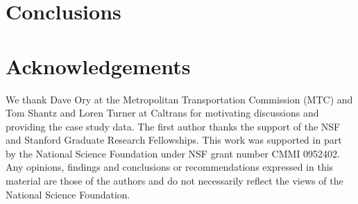 \documentclass[3p,times]{elsarticle}
\begin{document}
\section{Conclusions}
\label{sec:accConc}


\section{Acknowledgements}
\label{sec:accAckn}
We thank Dave Ory at the Metropolitan Transportation Commission (MTC) and Tom Shantz and Loren Turner at Caltrans for motivating discussions and providing the case study data. The first author thanks the support of the NSF and Stanford Graduate Research Fellowships. This work was supported in part by the National Science Foundation under NSF grant number CMMI 0952402. Any opinions, findings and conclusions or recommendations expressed in this material are those of the authors and do not necessarily reflect the views of the National Science Foundation.














\end{document}
